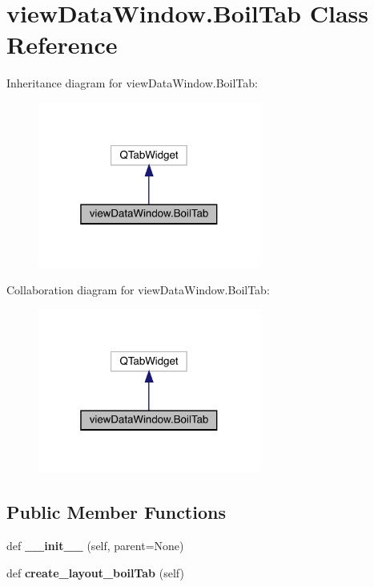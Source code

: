 \hypertarget{classview_data_window_1_1_boil_tab}{}\section{view\+Data\+Window.\+Boil\+Tab Class Reference}
\label{classview_data_window_1_1_boil_tab}


Inheritance diagram for view\+Data\+Window.\+Boil\+Tab\+:\nopagebreak
\begin{figure}[H]
\begin{center}
\leavevmode
\includegraphics[width=208pt]{classview_data_window_1_1_boil_tab__inherit__graph}
\end{center}
\end{figure}


Collaboration diagram for view\+Data\+Window.\+Boil\+Tab\+:\nopagebreak
\begin{figure}[H]
\begin{center}
\leavevmode
\includegraphics[width=208pt]{classview_data_window_1_1_boil_tab__coll__graph}
\end{center}
\end{figure}
\subsection*{Public Member Functions}
\begin{DoxyCompactItemize}
\item 
\mbox{\label{classview_data_window_1_1_boil_tab_afaa8d572f1753ccb48a6f7fc13408e1d}} 
def {\bfseries \+\_\+\+\_\+init\+\_\+\+\_\+} (self, parent=None)
\item 
\mbox{\label{classview_data_window_1_1_boil_tab_af402afaf08d1815cfb9bfb84a3b4a6c2}} 
def {\bfseries create\+\_\+layout\+\_\+boil\+Tab} (self)
\end{DoxyCompactItemize}
